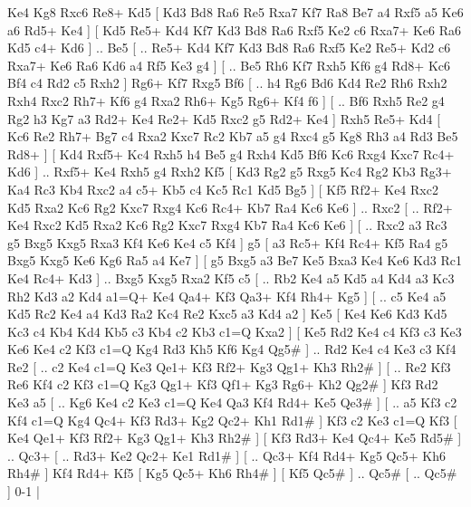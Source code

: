 Ke4   Kg8    Rxc6   Re8+    Kd5 [  Kd3 Bd8  Ra6 Re5  Rxa7 Kf7  Ra8 Be7  a4 Rxf5  a5 Ke6  a6 Rd5+  Ke4   ]  [  Kd5 Re5+  Kd4 Kf7  Kd3 Bd8  Ra6 Rxf5  Ke2 c6  Rxa7+ Ke6  Ra6 Kd5  c4+ Kd6   ] .. Be5 [ .. Re5+  Kd4 Kf7  Kd3 Bd8  Ra6 Rxf5  Ke2 Re5+  Kd2 c6  Rxa7+ Ke6  Ra6 Kd6  a4 Rf5  Ke3 g4   ]  [ .. Be5  Rh6 Kf7  Rxh5 Kf6  g4 Rd8+  Kc6 Bf4  c4 Rd2  c5 Rxh2   ]  Rg6+   Kf7    Rxg5   Bf6 [ .. h4  Rg6 Bd6  Kd4 Re2  Rh6 Rxh2  Rxh4 Rxc2  Rh7+ Kf6  g4 Rxa2  Rh6+ Kg5  Rg6+ Kf4  f6   ]  [ .. Bf6  Rxh5 Re2  g4 Rg2  h3 Kg7  a3 Rd2+  Ke4 Re2+  Kd5 Rxc2  g5 Rd2+  Ke4   ]  Rxh5   Re5+    Kd4 [  Kc6 Re2  Rh7+ Bg7  c4 Rxa2  Kxc7 Rc2  Kb7 a5  g4 Rxc4  g5 Kg8  Rh3 a4  Rd3 Be5  Rd8+   ]  [  Kd4 Rxf5+  Kc4 Rxh5  h4 Be5  g4 Rxh4  Kd5 Bf6  Kc6 Rxg4  Kxc7 Rc4+  Kd6   ] .. Rxf5+    Ke4   Rxh5    g4   Rxh2    Kf5 [  Kd3 Rg2  g5 Rxg5  Kc4 Rg2  Kb3 Rg3+  Ka4 Rc3  Kb4 Rxc2  a4 c5+  Kb5 c4  Kc5 Rc1  Kd5 Bg5   ]  [  Kf5 Rf2+  Ke4 Rxc2  Kd5 Rxa2  Kc6 Rg2  Kxc7 Rxg4  Kc6 Rc4+  Kb7 Ra4  Kc6 Ke6   ] .. Rxc2 [ .. Rf2+  Ke4 Rxc2  Kd5 Rxa2  Kc6 Rg2  Kxc7 Rxg4  Kb7 Ra4  Kc6 Ke6   ]  [ .. Rxc2  a3 Rc3  g5 Bxg5  Kxg5 Rxa3  Kf4 Ke6  Ke4 c5  Kf4   ]  g5 [  a3 Rc5+  Kf4 Rc4+  Kf5 Ra4  g5 Bxg5  Kxg5 Ke6  Kg6 Ra5  a4 Ke7   ]  [  g5 Bxg5  a3 Be7  Ke5 Bxa3  Ke4 Ke6  Kd3 Rc1  Ke4 Rc4+  Kd3   ] .. Bxg5    Kxg5   Rxa2    Kf5   c5 [ .. Rb2  Ke4 a5  Kd5 a4  Kd4 a3  Kc3 Rh2  Kd3 a2  Kd4 a1=Q+  Ke4 Qa4+  Kf3 Qa3+  Kf4 Rh4+  Kg5   ]  [ .. c5  Ke4 a5  Kd5 Rc2  Ke4 a4  Kd3 Ra2  Kc4 Re2  Kxc5 a3  Kd4 a2   ]  Ke5 [  Ke4 Ke6  Kd3 Kd5  Kc3 c4  Kb4 Kd4  Kb5 c3  Kb4 c2  Kb3 c1=Q  Kxa2   ]  [  Ke5 Rd2  Ke4 c4  Kf3 c3  Ke3 Ke6  Ke4 c2  Kf3 c1=Q  Kg4 Rd3  Kh5 Kf6  Kg4 Qg5#   ] .. Rd2    Ke4   c4    Ke3   c3    Kf4   Re2 [ .. c2  Ke4 c1=Q  Ke3 Qe1+  Kf3 Rf2+  Kg3 Qg1+  Kh3 Rh2#   ]  [ .. Re2  Kf3 Re6  Kf4 c2  Kf3 c1=Q  Kg3 Qg1+  Kf3 Qf1+  Kg3 Rg6+  Kh2 Qg2#   ]  Kf3   Rd2    Ke3   a5 [ .. Kg6  Ke4 c2  Ke3 c1=Q  Ke4 Qa3  Kf4 Rd4+  Ke5 Qe3#   ]  [ .. a5  Kf3 c2  Kf4 c1=Q  Kg4 Qc4+  Kf3 Rd3+  Kg2 Qc2+  Kh1 Rd1#   ]  Kf3   c2    Ke3   c1=Q    Kf3 [  Ke4 Qe1+  Kf3 Rf2+  Kg3 Qg1+  Kh3 Rh2#   ]  [  Kf3 Rd3+  Ke4 Qc4+  Ke5 Rd5#   ] .. Qc3+ [ .. Rd3+  Ke2 Qc2+  Ke1 Rd1#   ]  [ .. Qc3+  Kf4 Rd4+  Kg5 Qc5+  Kh6 Rh4#   ]  Kf4   Rd4+    Kf5 [  Kg5 Qc5+  Kh6 Rh4#   ]  [  Kf5 Qc5#   ] .. Qc5#    [ .. Qc5#   ] 0-1  |
